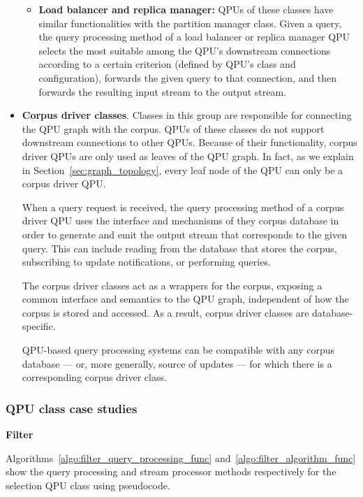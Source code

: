\begin{itemize}
\begin{itemize}
    \item \textbf{Load balancer and replica manager:}
    QPUs of these classes have similar functionalities with the partition manager class.
    Given a query, the query processing method of a load balancer or replica manager QPU selects the most suitable
    among the QPU's downstream connections according to a certain criterion (defined by QPU's class and configuration),
    forwards the given query to that connection, and then forwards the resulting input stream to the output stream.
    \end{itemize}

  \item \textbf{Corpus driver classes}.
  Classes in this group are responsible for connecting the QPU graph with the corpus.
  QPUs of these classes do not support downstream connections to other QPUs.
  Because of their functionality, corpus driver QPUs are only used as leaves of the QPU graph.
  In fact, as we explain in Section~\ref{sec:graph_topology}, every leaf node of the QPU can only be a corpus driver QPU.

  When a query request is received, the query processing method of a corpus driver QPU uses the interface and mechanisms
  of they corpus database in order to generate and emit the output stream that corresponds to the given query.
  This can include reading from the database that stores the corpus, subscribing to update notifications,
  or performing queries.

  The corpus driver classes act as a wrappers for the corpus, exposing a common interface and semantics to the
  QPU graph, independent of how the corpus is stored and accessed.
  As a result, corpus driver classes are database-specific.

  QPU-based query processing systems can be compatible with any corpus database --- or, more generally, source of updates ---
  for which there is a corresponding corpus driver class.
\end{itemize}

\subsubsection{QPU class case studies}
\label{sec:qpu_class_examples}

\textbf{Filter}

Algorithms~\ref{algo:filter_query_processing_func} and~\ref{algo:filter_algorithm_func} show the query processing and
stream processor methods respectively for the selection QPU class using pseudocode.


